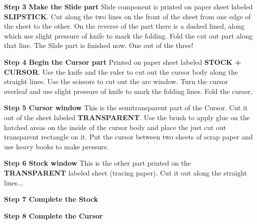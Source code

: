 \documentclass[a4paper,10pt]{article}
\begin{document}
\begin{multicols*}{2}
{  \textbf{Step 3 Make the Slide part} Slide component is printed on paper sheet labeled \textbf{SLIPSTICK}. Cut along the two lines on the front of the sheet from one edge of the sheet to the other. On the reverse of the part there is a dashed lined, along which use slight pressure of knife to mark the folding. Fold the cut out part along that line. The Slide part is finished now. One out of the three!

  \textbf{Step 4 Begin the Cursor part} Printed on paper sheet labeled \textbf{STOCK + CURSOR}. Use the knife and the ruler to cut out the cursor body along the straight lines. Use the scissors to cut out the arc window. Turn the cursor overleaf and use slight pressure of knife to mark the folding lines. Fold the cursor.

  \textbf{Step 5 Cursor window} This is the semitransparent part of the Cursor. Cut it out of the sheet labeled \textbf{TRANSPARENT}. Use the brush to apply glue on the hatched areas on the inside of the cursor body and place the just cut out transparent rectangle on it. Put the cursor between two sheets of scrap paper and use heavy books to make pressure.

  \textbf{Step 6 Stock window} This is the other part printed on the \textbf{TRANSPARENT} labeled sheet (tracing paper). Cut it out along the straight lines...

  \textbf{Step 7 Complete the Stock}

  \textbf{Step 8 Complete the Cursor}

  }
  \end{multicols*}
  
\end{document}
